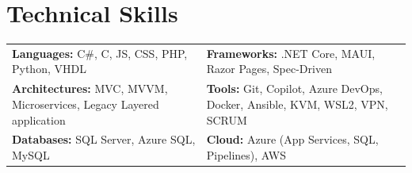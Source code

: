 \section*{Technical Skills}
\begin{tabularx}{\textwidth}{X X}
\textbf{Languages:} C\#, C, JS, CSS, PHP, Python, VHDL & 
\textbf{Frameworks:} .NET Core, MAUI, Razor Pages, Spec-Driven \\

\textbf{Architectures:} MVC, MVVM, Microservices, Legacy Layered application & 
\textbf{Tools:} Git, Copilot, Azure DevOps, Docker, Ansible, KVM, WSL2, VPN, SCRUM \\
\textbf{Databases:} SQL Server, Azure SQL, MySQL &
\textbf{Cloud:} Azure (App Services, SQL, Pipelines), AWS \\
\end{tabularx}
